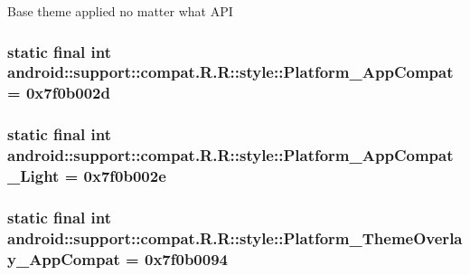 Base theme applied no matter what API \hypertarget{classandroid_1_1support_1_1compat_1_1_r_1_1style_254703d49098347edd6a18d48f48a389}{
\subsubsection[{Platform\_\-AppCompat}]{\setlength{\rightskip}{0pt plus 5cm}static final int android::support::compat.R.R::style::Platform\_\-AppCompat = 0x7f0b002d}}
\label{classandroid_1_1support_1_1compat_1_1_r_1_1style_254703d49098347edd6a18d48f48a389}


\hypertarget{classandroid_1_1support_1_1compat_1_1_r_1_1style_d2b25498628ae4adac99f489e0297835}{
\subsubsection[{Platform\_\-AppCompat\_\-Light}]{\setlength{\rightskip}{0pt plus 5cm}static final int android::support::compat.R.R::style::Platform\_\-AppCompat\_\-Light = 0x7f0b002e}}
\label{classandroid_1_1support_1_1compat_1_1_r_1_1style_d2b25498628ae4adac99f489e0297835}


\hypertarget{classandroid_1_1support_1_1compat_1_1_r_1_1style_fccefff76b08c544b17b106712274460}{
\subsubsection[{Platform\_\-ThemeOverlay\_\-AppCompat}]{\setlength{\rightskip}{0pt plus 5cm}static final int android::support::compat.R.R::style::Platform\_\-ThemeOverlay\_\-AppCompat = 0x7f0b0094}}
\label{classandroid_1_1support_1_1compat_1_1_r_1_1style_fccefff76b08c544b17b106712274460}


